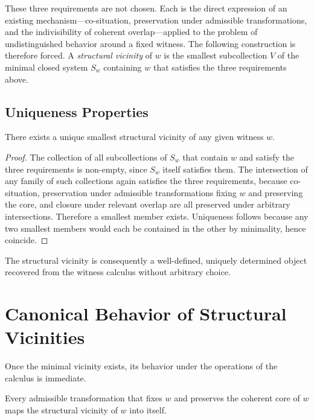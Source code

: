 \documentclass[12pt,anyside]{book}
\newcommand{\term}[1]{\textit{#1}}             %
\begin{document}
These three requirements are not chosen. Each is the direct expression of an existing mechanism---co-situation, preservation under admissible transformations, and the indivisibility of coherent overlap---applied to the problem of undistinguished behavior around a fixed witness. The following construction is therefore forced. A \term{structural vicinity} of $w$ is the smallest subcollection $V$ of the minimal closed system $S_w$ containing $w$ that satisfies the three requirements above.

\subsection{Uniqueness Properties}
\begin{theorem}
There exists a unique smallest structural vicinity of any given witness $w$.
\end{theorem}

\begin{proof}
The collection of all subcollections of $S_w$ that contain $w$ and satisfy the three requirements is non-empty, since $S_w$ itself satisfies them. The intersection of any family of such collections again satisfies the three requirements, because co-situation, preservation under admissible transformations fixing $w$ and preserving the core, and closure under relevant overlap are all preserved under arbitrary intersections. Therefore a smallest member exists. Uniqueness follows because any two smallest members would each be contained in the other by minimality, hence coincide.
\end{proof}

The structural vicinity is consequently a well-defined, uniquely determined object recovered from the witness calculus without arbitrary choice.

\section{Canonical Behavior of Structural Vicinities}
Once the minimal vicinity exists, its behavior under the operations of the calculus is immediate.

\begin{theorem}
Every admissible transformation that fixes $w$ and preserves the coherent core of $w$ maps the structural vicinity of $w$ into itself.
\end{theorem}
\end{document}
